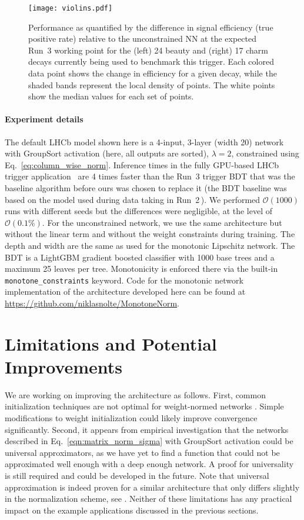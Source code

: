 \documentclass{article}
\begin{document}
\begin{figure}[t!]
    \centering
    \texttt{[image: violins.pdf]}
    \caption{Performance as quantified by the difference in signal efficiency (true positive rate) relative to the unconstrained NN at the expected Run~3 working point for the (left) 24 beauty and (right) 17 charm decays currently being used to benchmark this trigger. Each colored data point shows the change in efficiency for a given decay, while the shaded bands represent the local density of points. The white points show the median values for each set of points.}
    \label{fig:candles}
\end{figure}


\paragraph{Experiment details} The default LHCb model shown here is a 4-input, 3-layer (width 20) network with GroupSort activation (here, all outputs are sorted), $\lambda \!=\! 2$, constrained using Eq.~\eqref{eq:column_wise_norm}. Inference times in the fully GPU-based LHCb trigger application~\cite{Aaij:2019zbu} are 4 times faster than the Run~3 trigger BDT that was the baseline algorithm before ours was chosen to replace it (the BDT baseline was based on the model used during data taking in Run~2\,\cite{BBDT,LHCb-PROC-2015-018}). We performed $\mathcal{O}(1000)$ runs with different seeds but the differences were negligible, at the level of $\mathcal{O}(0.1\%)$.
For the unconstrained network, we use the same architecture but without the linear term and without the weight constraints during training. The depth and width are the same as used for the monotonic Lipschitz network.
The BDT is a LightGBM \cite{lightgbm} gradient boosted classifier with 1000 base trees and a maximum 25 leaves per tree. Monotonicity is enforced there via the built-in \verb|monotone_constraints| keyword.
Code for the monotonic network implementation of the architecture developed here can be found at \url{https://github.com/niklasnolte/MonotoneNorm}.

\section{Limitations and Potential Improvements} 
\label{sec:improve}

We are working on improving the architecture as follows.
First, common initialization techniques are not optimal for weight-normed networks
\cite{arpit2019initialize}. Simple modifications to weight initialization could likely improve convergence significantly. Second, it appears from empirical investigation that the
networks described in Eq.~\eqref{eqn:matrix_norm_sigma} with GroupSort activation
could be universal approximators, as we have yet to find a function that could not
be approximated well enough with a deep enough network. A proof for universality
is still required and could be developed in the future. Note that universal approximation is indeed proven for a similar architecture that only differs slightly in the normalization scheme, see \cite{sorting2019}.
Neither of these limitations has any practical impact on the example applications discussed in the previous sections. 
\end{document}
